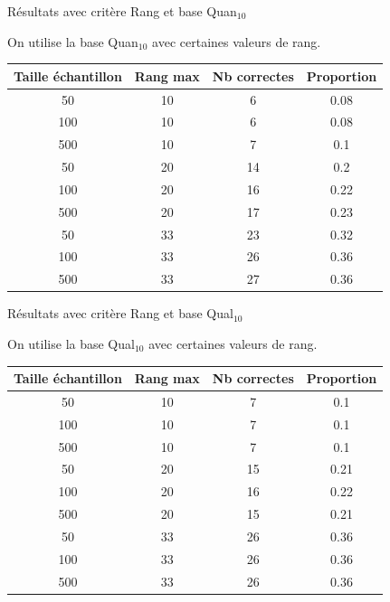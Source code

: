 \documentclass{beamer}
\begin{document}
\begin{frame}{Résultats avec critère Rang et base Quan$_{10}$}

On utilise la base Quan$_{10}$ avec certaines valeurs de rang.
\begin{tabular}{|c|c|c|c|}
   \hline
   Taille échantillon & Rang max & Nb correctes & Proportion\\
   \hline
   50 & 10  & 6 & 0.08  \\
   \hline
   100 & 10  & 6 & 0.08  \\
   \hline
   500 & 10  & 7 & 0.1  \\
   \hline
   \hline
   50 & 20 & 14 & 0.2  \\
   \hline
   100 & 20 & 16 & 0.22  \\
   \hline
   500 & 20 & 17 & 0.23  \\
   \hline
   \hline
   50 & 33 & 23 & 0.32  \\
   \hline
   100 & 33 & 26 & 0.36  \\
   \hline
   500 & 33 & 27 & 0.36  \\
   \hline
\end{tabular}

\end{frame}

\begin{frame}{Résultats avec critère Rang et base Qual$_{10}$}

On utilise la base Qual$_{10}$ avec certaines valeurs de rang.
\begin{tabular}{|c|c|c|c|}
   \hline
   Taille échantillon & Rang max & Nb correctes & Proportion\\
   \hline
   50 & 10  & 7 & 0.1  \\
   \hline
   100 & 10  & 7 & 0.1  \\
   \hline
   500 & 10  & 7 & 0.1  \\
   \hline
   \hline
   50 & 20  & 15 & 0.21  \\
   \hline
   100 & 20 & 16 & 0.22  \\
   \hline
   500 & 20 & 15 & 0.21  \\
   \hline
   \hline
   50 & 33 & 26 & 0.36  \\
   \hline
   100 & 33 & 26 & 0.36  \\
   \hline
   500 & 33 & 26 & 0.36  \\
   \hline
\end{tabular}
\end{frame}
\end{document}
